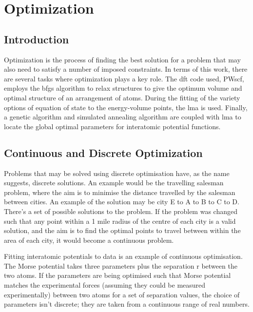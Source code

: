 \FloatBarrier
\section{Optimization}

\subsection{Introduction}

Optimization is the process of finding the best solution for a problem that may also need to satisfy a number of imposed constraints.  In terms of this work, there are several tasks where optimization plays a key role.  The \acrshort{dft} code used, PWscf, employs the \acrlong{bfgs} algorithm to relax structures to give the optimum volume and optimal structure of an arrangement of atoms.  During the fitting of the variety options of equation of state to the energy-volume points, the \acrlong{lma} is used.  Finally, a genetic algorithm and simulated annealing algorithm are coupled with \acrshort{lma} to locate the global optimal parameters for interatomic potential functions.


\subsection{Continuous and Discrete Optimization}

Problems that may be solved using discrete optimisation have, as the name suggests, discrete solutions.  An example would be the travelling salesman problem, where the aim is to minimise the distance travelled by the salesman between cities.  An example of the solution may be city E to A to B to C to D.  There's a set of possible solutions to the problem.  If the problem was changed such that any point within a 1 mile radius of the centre of each city is a valid solution, and the aim is to find the optimal points to travel between within the area of each city, it would become a continuous problem.

Fitting interatomic potentials to data is an example of continuous optimisation.  The Morse potential takes three parameters plus the separation r between the two atoms.  If the parameters are being optimised such that Morse potential matches the experimental forces (assuming they could be measured experimentally) between two atoms for a set of separation values, the choice of parameters isn't discrete; they are taken from a continuous range of real numbers.



